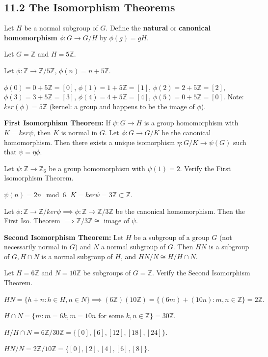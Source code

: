 \documentclass{article}
\newcommand{\Z}{\mathbb{Z}}
\begin{document}
\subsection{11.2 The Isomorphism Theorems}
Let $H$ be a normal subgroup of $G$. Define the \textbf{natural} or \textbf{canonical homomorphism} $\phi:G\to G/H$ by $\phi(g)=gH$.
\begin{example}
  Let $G=\Z$ and $H=5\Z$.

  Let $\phi:\Z\to\Z/5\Z$, $\phi(n)=n+5\Z$.

  $\phi(0)=0+5\Z=[0]$, $\phi(1)=1+5\Z=[1]$, $\phi(2)=2+5\Z=[2]$, $\phi(3)=3+5\Z=[3]$, $\phi(4)=4+5\Z=[4]$, $\phi(5)=0+5\Z=[0]$. Note: $ker(\phi)=5\Z$ (kernel: a group and happens to be the image of $\phi$).
\end{example}
\begin{theorem}
  \textbf{First Isomorphism Theorem:} If $\psi:G\to H$ is a group homomorphism with $K=ker\psi$, then $K$ is normal in $G$. Let $\phi:G\to G/K$ be the canonical homomorphism. Then there exists a unique isomorphism $\eta:G/K\to\psi(G)$ such that $\psi=\eta\phi$.
\end{theorem}
\begin{example}
  Let $\psi:\Z\to\Z_6$ be a group homomorphism with $\psi(1)=2$. Verify the First Isomorphism Theorem.

  $\psi(n)=2n\mod 6.$ $K=ker\psi=3\Z\subset\Z$.

  Let $\phi:\Z\to\Z/ker\psi\implies\phi:\Z\to\Z/3\Z$ be the canonical homomorphism. Then the First Iso. Theorem $\implies \Z/3\Z\cong$ image of $\psi$.
\end{example}
\begin{theorem}
  \textbf{Second Isomorphism Theorem:} Let $H$ be a subgroup of a group $G$ (not necessarily normal in $G$) and $N$ a normal subgroup of $G$. Then $HN$ is a subgroup of $G, H\cap N$ is a normal subgroup of $H$, and $HN/N\cong H/H\cap N$.
\end{theorem}
\begin{example}
  Let $H=6\Z$ and $N=10\Z$ be subgroups of $G=\Z$. Verify the Second Isomorphism Theorem.

  $HN=\{h+n:h\in H, n\in N\}\implies(6\Z)(10\Z)=\{(6m)+(10n):m,n\in\Z\}=2\Z.$

  $H\cap N=\{m:m=6k,m=10n\text{ for some }k,n\in\Z\}=30\Z.$

  $H/H\cap N=6\Z/30\Z=\{[0],[6], [12], [18], [24]\}$.

  $HN/N=2\Z/10\Z=\{[0],[2],[4],[6],[8]\}$.
\end{example}
\end{document}
